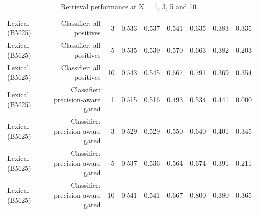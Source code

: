 \begin{table}[t]
\begin{tabular}{lrrrrrrrr}
Lexical (BM25) & Classifier: all positives & 3 & 0.533 & 0.537 & 0.541 & 0.635 & 0.383 & 0.335 \\
Lexical (BM25) & Classifier: all positives & 5 & 0.535 & 0.539 & 0.570 & 0.663 & 0.382 & 0.203 \\
Lexical (BM25) & Classifier: all positives & 10 & 0.543 & 0.545 & 0.667 & 0.791 & 0.369 & 0.354 \\
Lexical (BM25) & Classifier: precision-aware gated & 1 & 0.515 & 0.516 & 0.493 & 0.534 & 0.441 & 0.000 \\
Lexical (BM25) & Classifier: precision-aware gated & 3 & 0.529 & 0.529 & 0.550 & 0.640 & 0.401 & 0.345 \\
Lexical (BM25) & Classifier: precision-aware gated & 5 & 0.537 & 0.536 & 0.564 & 0.674 & 0.391 & 0.211 \\
Lexical (BM25) & Classifier: precision-aware gated & 10 & 0.541 & 0.541 & 0.667 & 0.800 & 0.380 & 0.365 \\
\hline
\end{tabular}
\caption{Retrieval performance at K = 1, 3, 5 and 10.}
\label{tab:table4_performance_across_k}
\end{table}
